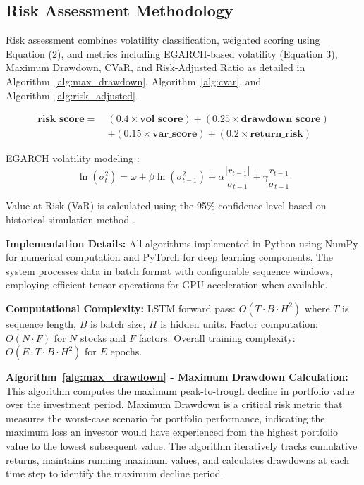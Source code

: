 \documentclass[3p,times,procedia]{elsarticle}
\begin{document}
\subsection{Risk Assessment Methodology}
Risk assessment combines volatility classification, weighted scoring using Equation (2), and metrics including EGARCH-based volatility (Equation 3), Maximum Drawdown, CVaR, and Risk-Adjusted Ratio as detailed in Algorithm~\ref{alg:max_drawdown}, Algorithm~\ref{alg:cvar}, and Algorithm~\ref{alg:risk_adjusted} \cite{Jorion2001,Rockafellar2000}.

\begin{align}
\mathbf{risk\_score} =\ & (0.4 \times \mathbf{vol\_score}) + (0.25 \times \mathbf{drawdown\_score}) \nonumber \\
& + (0.15 \times \mathbf{var\_score}) + (0.2 \times \mathbf{return\_risk})
\end{align}

EGARCH volatility modeling \cite{Nelson1991}:
\begin{equation}
\ln(\sigma_t^2) = \omega + \beta \ln(\sigma_{t-1}^2) + \alpha \frac{|r_{t-1}|}{\sigma_{t-1}} + \gamma \frac{r_{t-1}}{\sigma_{t-1}}
\end{equation}

Value at Risk (VaR) is calculated using the 95\% confidence level based on historical simulation method \cite{Jorion2001}.

\textbf{Implementation Details:} All algorithms implemented in Python using NumPy for numerical computation and PyTorch for deep learning components. The system processes data in batch format with configurable sequence windows, employing efficient tensor operations for GPU acceleration when available.

\textbf{Computational Complexity:} LSTM forward pass: $O(T \cdot B \cdot H^2)$ where $T$ is sequence length, $B$ is batch size, $H$ is hidden units. Factor computation: $O(N \cdot F)$ for $N$ stocks and $F$ factors. Overall training complexity: $O(E \cdot T \cdot B \cdot H^2)$ for $E$ epochs.

\textbf{Algorithm~\ref{alg:max_drawdown} - Maximum Drawdown Calculation:} This algorithm computes the maximum peak-to-trough decline in portfolio value over the investment period. Maximum Drawdown is a critical risk metric that measures the worst-case scenario for portfolio performance, indicating the maximum loss an investor would have experienced from the highest portfolio value to the lowest subsequent value. The algorithm iteratively tracks cumulative returns, maintains running maximum values, and calculates drawdowns at each time step to identify the maximum decline period.
\end{document}
